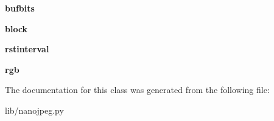 \begin{DoxyCompactItemize}
{\bfseries bufbits}
\item 
\mbox{\label{class_python_01_g_u_i_1_1lib_1_1nanojpeg_1_1nj__context__t_a77bd8f759f16555859ad26681f89e2dd}} 
{\bfseries block}
\item 
\mbox{\label{class_python_01_g_u_i_1_1lib_1_1nanojpeg_1_1nj__context__t_a5a5aee7edea673b408c2ebbea73b0907}} 
{\bfseries rstinterval}
\item 
\mbox{\label{class_python_01_g_u_i_1_1lib_1_1nanojpeg_1_1nj__context__t_a935cafdba363e56bf9d1f9e6ba7a9fdb}} 
{\bfseries rgb}
\end{DoxyCompactItemize}


The documentation for this class was generated from the following file\+:\begin{DoxyCompactItemize}
\item 
lib/nanojpeg.\+py\end{DoxyCompactItemize}
